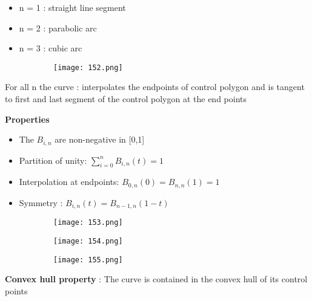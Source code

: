 \documentclass{article}
\begin{document}
\begin{itemize}
    \item n = 1 : straight line segment
    \item n = 2 : parabolic arc
    \item n = 3 : cubic arc
\end{itemize}

    \begin{figure}[ht!]
  \centering
  \begin{subfigure}[b]{0.4\linewidth}
    \texttt{[image: 152.png]}
  \end{subfigure}
\end{figure}

For all n the curve : interpolates the endpoints of control polygon and is tangent to first and last segment of the control polygon at the end points


\textbf{Properties}

\begin{itemize}
    \item The $B_{i,n}$ are non-negative in [0,1]
    \item Partition of unity: $\sum_{i=0}^n B_{i,n} (t) = 1$
    \item Interpolation at endpoints: $B_{0,n} (0) = B_{n,n}(1) = 1$
    \item Symmetry : $B_{i,n} (t) = B_{n-1,n}(1-t)$
\end{itemize}


    \begin{figure}[ht!]
  \centering
  \begin{subfigure}[b]{0.6\linewidth}
    \texttt{[image: 153.png]}
  \end{subfigure}
\end{figure}

   \begin{figure}[ht!]
  \centering
  \begin{subfigure}[b]{0.6\linewidth}
    \texttt{[image: 154.png]}
  \end{subfigure}
\end{figure}

   \begin{figure}[ht!]
  \centering
  \begin{subfigure}[b]{0.6\linewidth}
    \texttt{[image: 155.png]}
  \end{subfigure}
\end{figure}


\textbf{Convex hull property} : The curve is contained in the convex hull of its control points
\end{document}
